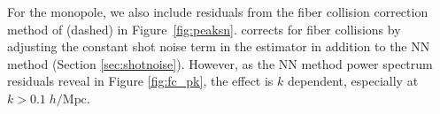                                                                                                                                                                                                                                                                          For the monopole, we also include residuals from the 
                                                                                                                                                                                                                                                                         fiber collision correction method of \cite{Gil-Marin:2014aa} (dashed) in 
                                                                                                                                                                                                                                                                         Figure~\ref{fig:peaksn}.
                                                                                                                                                                                                                                                                         \cite{Gil-Marin:2014aa} corrects for fiber collisions by adjusting the 
                                                                                                                                                                                                                                                                         constant shot noise term in the estimator in addition to the NN method 
                                                                                                                                                                                                                                                                         (Section \ref{sec:shotnoise}).
                                                                                                                                                                                                                                                                         However, as the NN method power spectrum residuals reveal in 
                                                                                                                                                                                                                                                                         Figure \ref{fig:fc_pk}, the effect is $k$ dependent, especially 
                                                                                                                                                                                                                                                                         at $k > 0.1 \;h/\mathrm{Mpc}$. 

